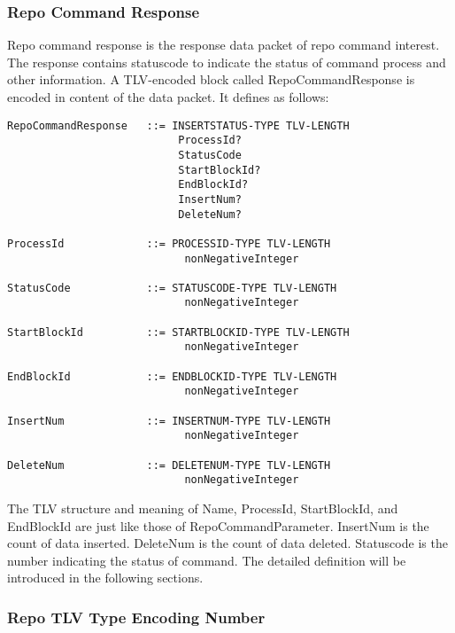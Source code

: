 \documentclass{acm_proc_article-sp}
\begin{document}
\subsubsection{Repo Command Response}
Repo command response is the response data packet of repo command interest. The response contains statuscode to indicate the status of command process and other information. A TLV-encoded block called RepoCommandResponse is encoded in content of the data packet. It defines as follows:

\begin{figure*}
\begin{framed}
\begin{BVerbatim}
RepoCommandResponse   ::= INSERTSTATUS-TYPE TLV-LENGTH
                           ProcessId?
                           StatusCode
                           StartBlockId?
                           EndBlockId?
                           InsertNum?
                           DeleteNum?

ProcessId             ::= PROCESSID-TYPE TLV-LENGTH
                            nonNegativeInteger 

StatusCode            ::= STATUSCODE-TYPE TLV-LENGTH
                            nonNegativeInteger    

StartBlockId          ::= STARTBLOCKID-TYPE TLV-LENGTH
                            nonNegativeInteger

EndBlockId            ::= ENDBLOCKID-TYPE TLV-LENGTH
                            nonNegativeInteger

InsertNum             ::= INSERTNUM-TYPE TLV-LENGTH
                            nonNegativeInteger

DeleteNum             ::= DELETENUM-TYPE TLV-LENGTH
                            nonNegativeInteger

\end{BVerbatim}
\end{framed}
\end{figure*}

The TLV structure and meaning of Name, ProcessId, StartBlockId, and EndBlockId are just like those of RepoCommandParameter. InsertNum is the count of data inserted. DeleteNum is the count of data deleted. Statuscode is the number indicating the status of command. The detailed definition will be introduced in the following sections.

\subsubsection{Repo TLV Type Encoding Number}
\end{document}
